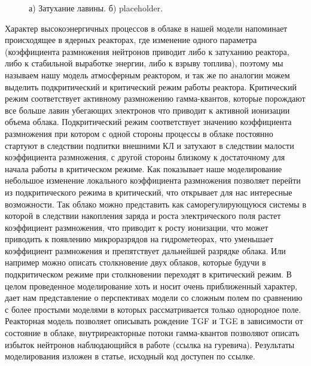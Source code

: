 \begin{figure}[t]
    \begin{center}
        \begin{minipage}[h]{0.49\linewidth}
        \end{minipage}
        \hfill
        \begin{minipage}[h]{0.49\linewidth}
        \end{minipage}
        \caption{а) Затухание лавины. б) placeholder.}
    \end{center}
    \label{thunder:rl_2}
\end{figure}

Характер высокоэнергичных процессов в облаке в нашей модели напоминает происходящее в ядерных реакторах, где изменение одного параметра (коэффициента размножения нейтронов приводит либо к затуханию реактора, либо к стабильной выработке энергии, либо к взрыву топлива), поэтому мы называем нашу модель атмосферным реактором, и так же по аналогии можем выделить подкритический и критический режим работы реактора. Критический режим соответствует активному размножению гамма-квантов, которые порождают все больше лавин убегающих электронов что приводит к активной ионизации объема облака. Подкритический режим соответствует значению коэффициента размножения  при котором с одной стороны процессы в облаке постоянно стартуют в следствии подпитки внешними КЛ и затухают в следствии малости коэффициента размножения, с другой стороны  близкому к достаточному для начала работы в критическом режиме. Как показывает наше моделирование небольшое изменение локального коэффициента размножения позволяет перейти из подкритического режима в критический, что открывает для нас интересные возможности. Так облако можно представить как саморегулирующуюся системы в которой в следствии накопления заряда и роста электрического поля растет коэффициент размножения, что приводит к росту ионизации, что может приводить к появлению микроразрядов на гидрометеорах, что уменьшает коэффициент размножения и препятствует дальнейшей разрядке облака. Или например можно описать столкновение двух облаков, которые будучи в подкритическом режиме при столкновении переходят в критический режим. В целом проведенное моделирование хоть и носит очень приближенный характер, дает нам представление о перспективах модели со сложным полем по сравнению с более простыми моделями в которых рассматривается только однородное поле. Реакторная модель позволяет описывать рождение TGF и TGE в зависимости от состояние в облаке, внутриреакторные потоки гамма-квантов позволяют описать избыток нейтронов наблюдающийся в работе (ссылка на гуревича). Результаты моделирования изложен в статье, исходный код доступен по ссылке.
